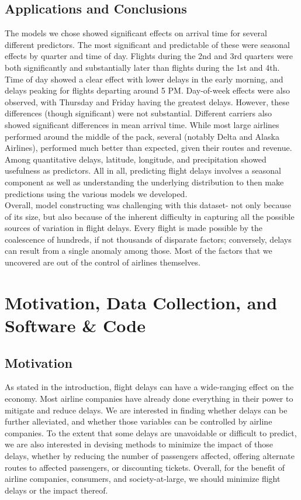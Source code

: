 \documentclass[12pt, a4paper, openany]{book}
\newcommand\tab[1][1cm]{\hspace*{#1}}
\begin{document}
	\section{Applications and Conclusions}
\tab The models we chose showed significant effects on arrival time for several different predictors. The most significant and predictable of these were seasonal effects by quarter and time of day. Flights during the 2nd and 3rd quarters were both significantly and substantially later than flights during the 1st and 4th. Time of day showed a clear effect with lower delays in the early morning, and delays peaking for flights departing around 5 PM. Day-of-week effects were also observed, with Thursday and Friday having the greatest delays. However, these differences (though significant) were not substantial. Different carriers also showed significant differences in mean arrival time. While most large airlines performed around the middle of the pack, several (notably Delta and Alaska Airlines), performed much better than expected, given their routes and revenue. Among quantitative delays, latitude, longitude, and precipitation showed usefulness as predictors. All in all, predicting flight delays involves a seasonal component as well as understanding the underlying distribution to then make predictions using the various models we developed.\\
\tab Overall, model constructing was challenging with this dataset- not only because of its size, but also because of the inherent difficulty in capturing all the possible sources of variation in flight delays. Every flight is made possible by the coalescence of hundreds, if not thousands of disparate factors; conversely, delays can result from a single anomaly among those. Most of the factors that we uncovered are out of the control of airlines themselves. 
\chapter{Motivation, Data Collection, and Software \& Code}
	\section{Motivation}
	\tab As stated in the introduction, flight delays can have a wide-ranging effect on the economy. Most airline companies have already done everything in their power to mitigate and reduce delays. We are interested in finding whether delays can be further alleviated, and whether those variables can be controlled by airline companies. To the extent that some delays are unavoidable or difficult to predict, we are also interested in devising methods to minimize the impact of those delays, whether by reducing the number of passengers affected, offering alternate routes to affected passengers, or discounting tickets. Overall, for the benefit of airline companies, consumers, and society-at-large, we should minimize flight delays or the impact thereof. 
\end{document}
